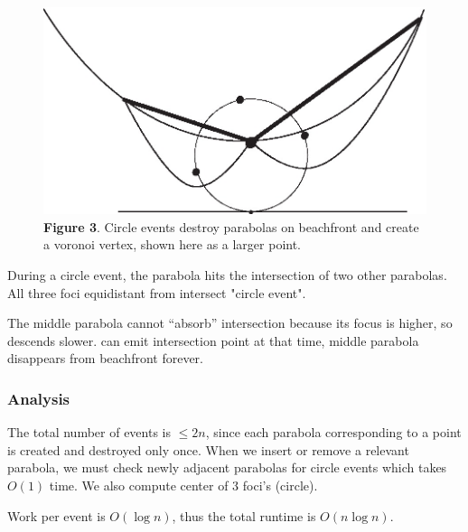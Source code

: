 \documentclass{article}
\begin{document}
 \begin{figure}[h]
 \begin{center}
 \includegraphics{voronoistep3.jpg}
 \caption{\textbf{Figure 3}. Circle events destroy parabolas on beachfront and create a voronoi vertex, shown here as a larger point.}
 \label{fig:step3}
 \end{center}
 \end{figure}

During a circle event, the parabola hits the intersection of two other parabolas.  All three foci equidistant from intersect "circle event".

The middle parabola cannot ``absorb'' intersection because its focus is higher, so descends slower. 
can emit intersection point at that time, middle parabola disappears from beachfront forever.

\subsubsection{Analysis}
The total number of events is $\leq 2n$, since each parabola corresponding to a point is created and destroyed only once. When we insert or remove a relevant parabola, we must check newly adjacent parabolas for circle events which takes $O(1)$ time. We also compute center of 3 foci's (circle).

Work per event is $O(\log n)$, thus the total runtime is $O(n \log n)$.
\end{document}
